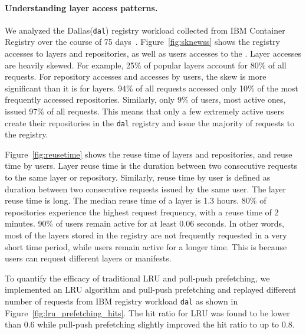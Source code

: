 



\paragraph{Understanding layer access patterns.}
We analyzed the Dallas(\texttt{dal}) registry workload collected from IBM Container Registry over the course of 75 days~\cite{dockerworkload}. 
Figure~\ref{fig:sknewss} shows the registry accesses to layers and repositories, as well as users accesses to the . 
Layer accesses are heavily skewed. For example, 25\% of popular layers account for 80\% of all requests. 
For repository accesses and accesses by users, the skew is more significant than it is for layers. %
94\% of all requests accessed only 10\% of the most frequently accessed repositories. Similarly, only 9\% of users, most active ones, issued 97\% of all requests. 
This means that only a few extremely active users create their repositories in the \texttt{dal} registry and issue the majority of requests to the registry.

Figure~\ref{fig:reusetime} shows the reuse time of layers and repositories, and reuse time by users.
Layer reuse time is the duration between two consecutive requests to the same layer or repository. Similarly,
reuse time by user is defined as duration between two consecutive requests issued by the same user. 
The layer reuse time is long.
The median reuse time of a layer is 1.3 hours. 80\% of repositories experience the highest request frequency, with a reuse time of $2$ minutes. 
90\% of users remain active for at least $0.06$ seconds.
In other words, most of the layers stored in the
registry are not frequently requested in a very short
time period, while users remain active for a longer time.
This is because users can request different layers or manifests.

To quantify the efficacy of traditional LRU and pull-push prefetching,
we implemented an LRU algorithm and pull-push prefetching 
and replayed different number of requests from
IBM registry workload \texttt{dal} as shown in 
Figure~\ref{fig:lru_prefetching_hits}.
The hit ratio for LRU was found to be lower than $0.6$ 
while pull-push prefetching slightly improved the hit ratio to up to $0.8.$

